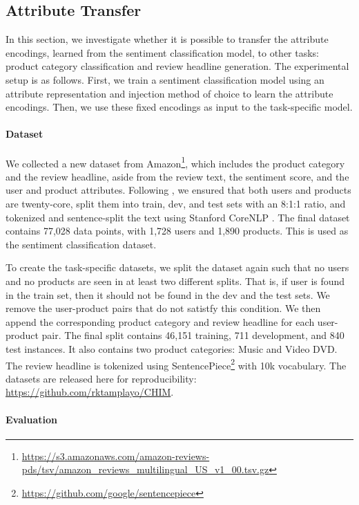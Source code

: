 \documentclass[11pt,a4paper]{article}
\begin{document}
\subsection{Attribute Transfer}

In this section, we investigate whether it is possible to transfer the attribute encodings, learned from the sentiment classification model, to other tasks: product category classification and review headline generation.
The experimental setup is as follows. First, we train a sentiment classification model using an attribute representation and injection method of choice to learn the attribute encodings. Then, we use these fixed encodings as input to the task-specific model.

\paragraph{Dataset}

We collected a new dataset from Amazon\footnote{\url{https://s3.amazonaws.com/amazon-reviews-pds/tsv/amazon_reviews_multilingual_US_v1_00.tsv.gz}}, which includes the product category and the review headline, aside from the review text, the sentiment score, and the user and product attributes. Following \citet{tang2015learning}, we ensured that both users and products are twenty-core, split them into train, dev, and test sets with an 8:1:1 ratio, and tokenized and sentence-split the text using Stanford CoreNLP \cite{manning2014stanford}. The final dataset contains 77,028 data points, with 1,728 users and 1,890 products. This is used as the sentiment classification dataset.

To create the task-specific datasets, we split the dataset again such that no users and no products are seen in at least two different splits. That is, if user  is found in the train set, then it should not be found in the dev and the test sets. We remove the user-product pairs that do not satistfy this condition. We then append the corresponding product category and review headline for each user-product pair. The final split contains 46,151 training, 711 development, and 840 test instances.
It also contains two product categories: Music and Video DVD. The review headline is tokenized using SentencePiece\footnote{\url{https://github.com/google/sentencepiece}} with 10k vocabulary. The datasets are released here for reproducibility: \url{https://github.com/rktamplayo/CHIM}.

\paragraph{Evaluation}
\end{document}
